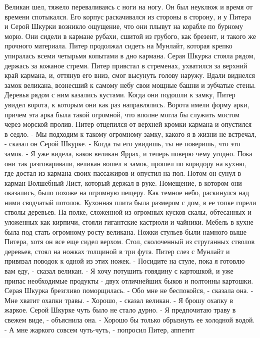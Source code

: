      Великан шел, тяжело переваливаясь с ноги на ногу. Он был неуклюж 
и время от времени спотыкался. Его корпус раскачивался из стороны в 
сторону, и у Питера и Серой Шкурки возникло ощущение, что они плывут 
на корабле по бурному морю. Они сидели в кармане рубахи, сшитой из 
грубого, как брезент, и такого же прочного материала.
    Питер продолжал сидеть на Мунлайт, которая крепко упиралась всеми 
четырьмя копытами в дно кармана. Серая Шкурка стояла рядом, держась за 
кожаное стремя.
    Питер привстал в стременах, ухватился за верхний край кармана, и, 
оттянув его вниз, смог высунуть голову наружу. Вдали виднелся замок 
великана, вознесший к самому небу свои мощные башни и зубчатые стены. 
Деревья рядом с ним казались кустами.
    Когда они подошли к замку, Питер увидел ворота, к которым они как 
раз направлялись. Ворота имели форму арки, причем эта арка была такой 
огромной, что вполне могла бы служить мостом через морской пролив.
    Питер отцепился от верхней кромки кармана и опустился в седло.
    - Мы подходим к такому огромному замку, какого я в жизни не 
встречал, - сказал он Серой Шкурке. - Когда ты его увидишь, ты не 
поверишь, что это замок.
    - Я уже видела, каков великан Яррах, и теперь поверю чему угодно.
    Пока они так разговаривали, великан вошел в замок, прошел по 
коридору на кухню, где достал из кармана своих пассажиров и опустил на 
пол. Потом он сунул в карман Волшебный Лист, который держал в руке.
    Помещение, в котором они оказались, было похоже на огромную 
пещеру. Как темное небо, раскинулся над ними сводчатый потолок. 
Кухонная плита была размером с дом, в ее топке горели стволы деревьев. 
На полке, сложенной из огромных кусков скалы, обтесанных и уложенных 
как кирпичи, стояли гигантские кастрюли и чайники.
    Мебель в кухне была под стать огромному росту великана. Ножки 
стульев были намного выше Питера, хотя он все еще сидел верхом. Стол, 
сколоченный из струганных стволов деревьев, стоял на ножках толщиной в 
три фута.
    Питер слез с Мунлайт и привязал поводок к одной из этих ножек.
    - Посидите на стуле, пока я готовлю вам еду, - сказал великан. - Я 
хочу потушить говядину с картошкой, и уже припас необходимые продукты 
- двух отличнейших быков и полтонны картошки.
    Серая Шкурка брезгливо поморщилась.
    - Обо мне не беспокойся, - сказала она. - Мне хватит охапки травы.
    - Хорошо, - сказал великан. - Я брошу охапку в жаркое.
    Серой Шкурке чуть было не стало дурно.
    - Я предпочитаю траву в свежем виде, - объяснила она. - Хорошо бы 
только обрызнуть ее холодной водой.
    - А мне жаркого совсем чуть-чуть, - попросил Питер, аппетит 
